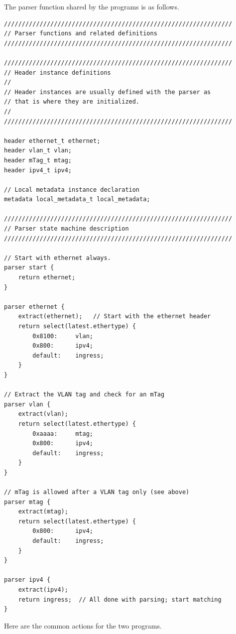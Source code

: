 \documentclass[12pt]{article}
\begin{document}
The parser function shared by the programs is as follows.

\begin{lstlisting}[keywords={},frame=single,escapechar=\@]
////////////////////////////////////////////////////////////////
// Parser functions and related definitions
////////////////////////////////////////////////////////////////

////////////////////////////////////////////////////////////////
// Header instance definitions
//
// Header instances are usually defined with the parser as
// that is where they are initialized.
//
////////////////////////////////////////////////////////////////

header ethernet_t ethernet;
header vlan_t vlan;
header mTag_t mtag;
header ipv4_t ipv4;

// Local metadata instance declaration
metadata local_metadata_t local_metadata;

////////////////////////////////////////////////////////////////
// Parser state machine description
////////////////////////////////////////////////////////////////

// Start with ethernet always.
parser start {
    return ethernet;    
}

parser ethernet {
    extract(ethernet);   // Start with the ethernet header
    return select(latest.ethertype) {
        0x8100:     vlan;
        0x800:      ipv4;
        default:    ingress;
    }
}

// Extract the VLAN tag and check for an mTag
parser vlan {
    extract(vlan);
    return select(latest.ethertype) {
        0xaaaa:     mtag;
        0x800:      ipv4;
        default:    ingress;
    }
}

// mTag is allowed after a VLAN tag only (see above)
parser mtag {
    extract(mtag);
    return select(latest.ethertype) {
        0x800:      ipv4;
        default:    ingress;
    }
}

parser ipv4 {
    extract(ipv4);
    return ingress;  // All done with parsing; start matching
}
\end{lstlisting}

Here are the common actions for the two programs.
\end{document}
